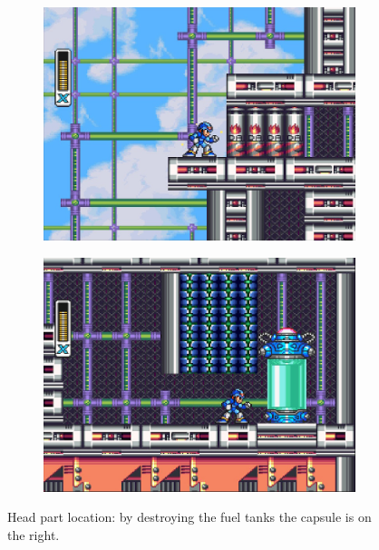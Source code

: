  \begin{figure}[h]
 	\centering
 	\begin{subfigure}{0.4\linewidth}
 		\centering
 		\includegraphics[width=\linewidth]{figures/X1/Storm_armor_1.jpg}
 		\caption{}
 	\end{subfigure}
 	\begin{subfigure}{0.4\linewidth}
 		\centering
 		\includegraphics[width=\linewidth]{figures/X1/Storm_armor_2.jpg}
 		\caption{}
 	\end{subfigure}
 	\caption{Head part location: by destroying the fuel tanks the capsule is on the right.}
 \end{figure}
 
